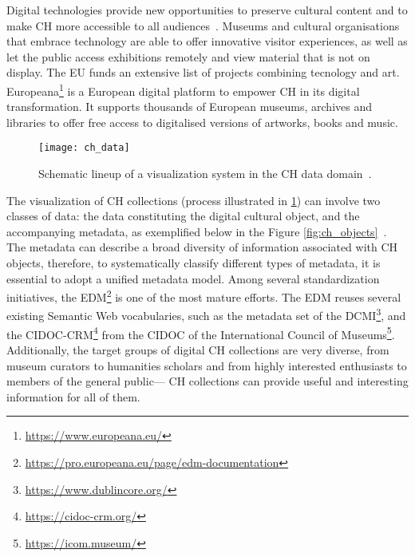 Digital technologies provide new opportunities to preserve cultural content and to make \gls{CH} more accessible to all audiences~\cite{eu_digital_heritage}. Museums and cultural organisations that embrace technology are able to offer innovative visitor experiences, as well as let the public access exhibitions remotely and view material that is not on display.
The \gls{EU} funds an extensive list of projects combining tecnology and art.
Europeana\footnote{\url{https://www.europeana.eu/}} is a European digital platform to empower \gls{CH} in its digital transformation. It supports thousands of European museums, archives and libraries to offer free access to digitalised versions of artworks, books and music.


\begin{figure}[h!]
    \centering
    \texttt{[image: ch\_data]}
    \caption{Schematic lineup of a visualization system in the CH data domain~\cite{Windhager2019Visualization}.}
    \label{fig:ch_data}
\end{figure}
\FloatBarrier

The visualization of \gls{CH} collections (process illustrated in \ref{fig:ch_data}) can involve two classes of data: the data constituting the digital cultural object, and
the accompanying metadata, as exemplified below in the Figure \ref{fig:ch_objects}~\cite{Windhager2019Visualization}.
The metadata can describe a broad diversity of information associated
with \gls{CH} objects, therefore, to systematically classify different types of metadata, it is essential to adopt a unified metadata model. 
Among several standardization initiatives, the \gls{EDM}\footnote{\url{https://pro.europeana.eu/page/edm-documentation}} is one of the most mature efforts. 
The \gls{EDM} reuses several existing Semantic Web vocabularies, such as the metadata set of the \gls{DCMI}\footnote{\url{https://www.dublincore.org/}}, and the
\gls{CIDOC-CRM}\footnote{\url{https://cidoc-crm.org/}} from the \gls{CIDOC} of the International Council of Museums\footnote{\url{https://icom.museum/}}. 
Additionally, the target groups of digital CH collections are very diverse, from museum curators to humanities scholars and from
highly interested enthusiasts to members of the general public— \gls{CH} collections can provide useful and interesting information for all of them. 


